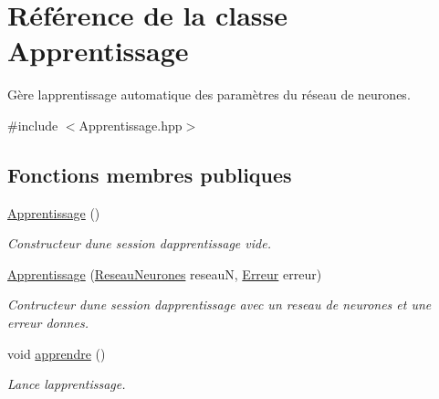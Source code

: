 \hypertarget{class_apprentissage}{}\section{Référence de la classe Apprentissage}
\label{class_apprentissage}


Gère l\textquotesingle{}apprentissage automatique des paramètres du réseau de neurones.  




{\ttfamily \#include $<$Apprentissage.\+hpp$>$}

\subsection*{Fonctions membres publiques}
\begin{DoxyCompactItemize}
\item 
\mbox{\label{class_apprentissage_a649ffeeec970b5ad604b41a987844387}} 
\hyperlink{class_apprentissage_a649ffeeec970b5ad604b41a987844387}{Apprentissage} ()
\begin{DoxyCompactList}\small\item\em Constructeur d\textquotesingle{}une session d\textquotesingle{}apprentissage vide. \end{DoxyCompactList}\item 
\mbox{\label{class_apprentissage_a1a510815ab52c24fb92bf9d5e0686101}} 
\hyperlink{class_apprentissage_a1a510815ab52c24fb92bf9d5e0686101}{Apprentissage} (\hyperlink{class_reseau_neurones}{Reseau\+Neurones} reseauN, \hyperlink{class_erreur}{Erreur} erreur)
\begin{DoxyCompactList}\small\item\em Contructeur d\textquotesingle{}une session d\textquotesingle{}apprentissage avec un reseau de neurones et une erreur donnes. \end{DoxyCompactList}\item 
\mbox{\label{class_apprentissage_aa90784b8d9692d451b1d9242bbe15554}} 
void \hyperlink{class_apprentissage_aa90784b8d9692d451b1d9242bbe15554}{apprendre} ()
\begin{DoxyCompactList}\small\item\em Lance l\textquotesingle{}apprentissage. \end{DoxyCompactList}\item 

\end{DoxyCompactItemize}
